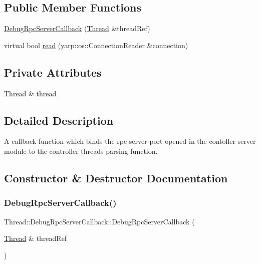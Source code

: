 \subsection*{Public Member Functions}
\begin{DoxyCompactItemize}
\item 
\hyperlink{classThread_1_1DebugRpcServerCallback_a479142cdf2f840df23b4605a532aaddf}{Debug\+Rpc\+Server\+Callback} (\hyperlink{classThread}{Thread} \&thread\+Ref)
\item 
virtual bool \hyperlink{classThread_1_1DebugRpcServerCallback_a3b39ac9b379ce3212bb2b05a89fa6024}{read} (yarp\+::os\+::\+Connection\+Reader \&connection)
\end{DoxyCompactItemize}
\subsection*{Private Attributes}
\begin{DoxyCompactItemize}
\item 
\hyperlink{classThread}{Thread} \& \hyperlink{classThread_1_1DebugRpcServerCallback_ad75683fc200019e8f681ad441b6ce84b}{thread}
\end{DoxyCompactItemize}


\subsection{Detailed Description}
A callback function which binds the rpc server port opened in the contoller server module to the controller thread\textquotesingle{}s parsing function. 

\subsection{Constructor \& Destructor Documentation}
\hypertarget{classThread_1_1DebugRpcServerCallback_a479142cdf2f840df23b4605a532aaddf}{}\label{classThread_1_1DebugRpcServerCallback_a479142cdf2f840df23b4605a532aaddf} 
\subsubsection{\texorpdfstring{Debug\+Rpc\+Server\+Callback()}{DebugRpcServerCallback()}}
{\footnotesize\ttfamily Thread\+::\+Debug\+Rpc\+Server\+Callback\+::\+Debug\+Rpc\+Server\+Callback (\begin{DoxyParamCaption}\item[{\hyperlink{classThread}{Thread} \&}]{thread\+Ref }\end{DoxyParamCaption})}

